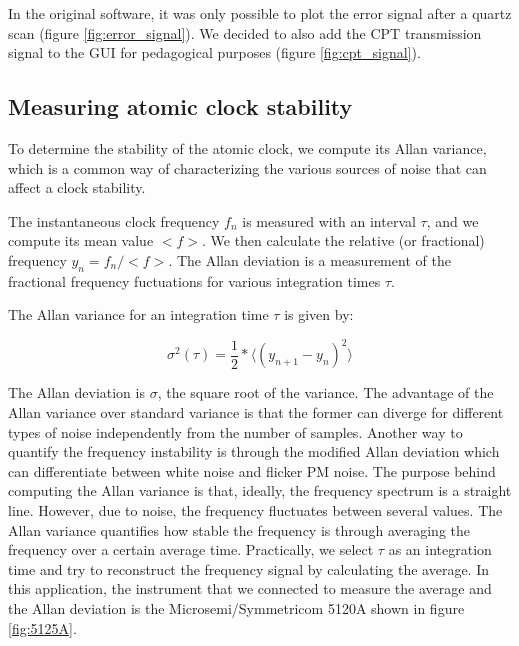 \documentclass[a4paper,12pt]{article}
\begin{document}
In the original software, it was only possible to plot the error signal after a quartz scan (figure \ref{fig:error_signal}). We decided to also add the CPT transmission signal to the GUI for pedagogical purposes (figure \ref{fig:cpt_signal}).

\subsection{Measuring atomic clock stability}

To determine the stability of the atomic clock, we compute its Allan variance, which is a common way of characterizing the various sources of noise that can affect a clock stability. 

The instantaneous clock frequency $f_n$ is measured with an interval $\tau$, and we compute its mean value $<f>$. We then calculate the relative (or fractional) frequency $y_n = f_n / <f>$.
The Allan deviation is a measurement of the fractional frequency fuctuations for various integration times $\tau$.

The Allan variance for an integration time $\tau$ is given by:

\begin{equation}
\sigma^2 (\tau) = \frac{1}{2}* \langle (y_{n+1}-y_n)^2 \rangle
\end{equation}


The Allan deviation is $\sigma$, the square root of the variance. The advantage of the Allan variance over standard variance is that the former can diverge for different types of noise independently from the number of samples. Another way to quantify the frequency instability is through the modified Allan deviation which can differentiate between white noise and flicker PM noise. The purpose behind computing the Allan variance is that, ideally, the frequency spectrum is a straight line. However, due to noise, the frequency fluctuates between several values. The Allan variance quantifies how stable the frequency is through averaging the frequency over a certain average time. Practically, we select $\tau$ as an integration time and try to reconstruct the frequency signal by calculating the average. In this application, the instrument that we connected to measure the average and the Allan deviation is the Microsemi\slash Symmetricom 5120A shown in figure \ref{fig:5125A}.
\end{document}
